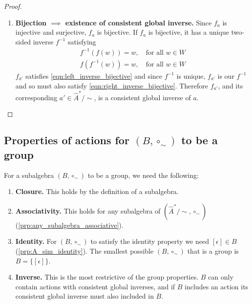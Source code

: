 \begin{proof}
\begin{enumerate}[(1)]
    \item \textbf{Bijection $\implies$ existence of consistent global inverse.}
    Since $f_{a}$ is injective and surjective, $f_{a}$ is bijective.
    If $f_{a}$ is bijective, it has a unique two-sided inverse $f^{-1}$ satisfying
    \begin{align}
        f^{-1}(f(w)) = w, \quad \text{for all $w \in W$} 
        \label{eqn:left_inverse_bijective}
        \\
        f(f^{-1}(w)) = w, \quad \text{for all $w \in W$}
        \label{eqn:right_inverse_bijective}
    \end{align}
    $f_{a'}$ satisfies \cref{eqn:left_inverse_bijective} and since $f^{-1}$ is unique, $f_{a'}$ is our $f^{-1}$ and so must also satisfy \cref{eqn:right_inverse_bijective}.
    Therefore $f_{a'}$, and its corresponding $a' \in \hat{A}^{*}/\sim$, is a consistent global inverse of $a$.
    \end{enumerate}
\end{proof}

\subsection{Properties of actions for $(B, \circ_{\sim})$ to be a group}

For a subalgebra $(B, \circ_{\sim})$ to be a group, we need the following:
\begin{enumerate}[(1)]
    \item \textbf{Closure.}
    This holds by the definition of a subalgebra.
    
    \item \textbf{Associativity.}
    This holds for any subalgebra of $(\hat{A}^{*}/\sim, \circ_{\sim})$ (\cref{prp:any_subalgebra_associative}).

    \item \textbf{Identity.}
    For $(B, \circ_{\sim})$ to satisfy the identity property we need $[\epsilon] \in B$ (\cref{prp:A_sim_identity}).
    The smallest possible $(B, \circ_{\sim})$ that is a group is $B = \{ [\epsilon] \}$.

    \item \textbf{Inverse.}
    This is the most restrictive of the group properties.
    $B$ can only contain actions with consistent global inverses, and if $B$ includes an action its consistent global inverse must also included in $B$.
\end{enumerate}

